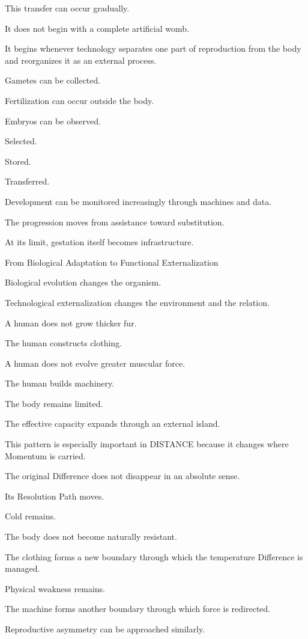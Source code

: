 This transfer can occur gradually.

It does not begin with a complete artificial womb.

It begins whenever technology separates one part of reproduction from the body and reorganizes it as an external process.

Gametes can be collected.

Fertilization can occur outside the body.

Embryos can be observed.

Selected.

Stored.

Transferred.

Development can be monitored increasingly through machines and data.

The progression moves from assistance toward substitution.

At its limit, gestation itself becomes infrastructure.

From Biological Adaptation to Functional Externalization

Biological evolution changes the organism.

Technological externalization changes the environment and the relation.

A human does not grow thicker fur.

The human constructs clothing.

A human does not evolve greater muscular force.

The human builds machinery.

The body remains limited.

The effective capacity expands through an external island.

This pattern is especially important in DISTANCE because it changes where Momentum is carried.

The original Difference does not disappear in an absolute sense.

Its Resolution Path moves.

Cold remains.

The body does not become naturally resistant.

The clothing forms a new boundary through which the temperature Difference is managed.

Physical weakness remains.

The machine forms another boundary through which force is redirected.

Reproductive asymmetry can be approached similarly.


